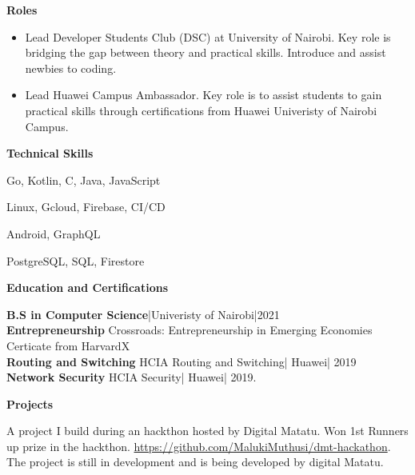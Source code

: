 \documentclass[a4paper]{article}
\begin{document}
\begin{center}
    {\Large \textbf{Roles}}
\end{center}
\begin{itemize}[noitemsep]
    \item Lead Developer Students Club (DSC) at University of Nairobi. Key role is bridging the gap between theory and practical skills. Introduce and assist newbies to coding.
    \item Lead Huawei Campus Ambassador. Key role is to assist students to gain practical skills through certifications from Huawei Univeristy of Nairobi Campus.
\end{itemize}

\begin{center}
    {\Large \textbf{Technical Skills}}
\end{center}
\begin{description}[noitemsep]
    \item[Languages] Go, Kotlin, C, Java, JavaScript
    \item[Platforms and tools] Linux, Gcloud, Firebase, CI/CD
    \item[Frameworks] Android, GraphQL
    \item[Databases] PostgreSQL, SQL, Firestore
\end{description}

\begin{center}
    {\Large \textbf{Education and Certifications}}
\end{center}
\textbf{B.S in Computer Science}|Univeristy of Nairobi|2021 \\
\textbf{Entrepreneurship} Crossroads: Entrepreneurship in Emerging Economies Certicate from HarvardX \\
\textbf{Routing and Switching} HCIA Routing and Switching| Huawei| 2019 \\
\textbf{Network Security} HCIA Security| Huawei| 2019. \par

\begin{center}
    {\Large \textbf{Projects} }
\end{center}
\begin{description}[noitemsep]
    \item[Digital Matatu Fare] A project I build during an hackthon hosted by Digital Matatu. Won 1st Runners up prize in the hackthon. \url{ https://github.com/MalukiMuthusi/dmt-hackathon}. The project is still in development and is being developed by digital Matatu.
\end{description}
\end{document}
